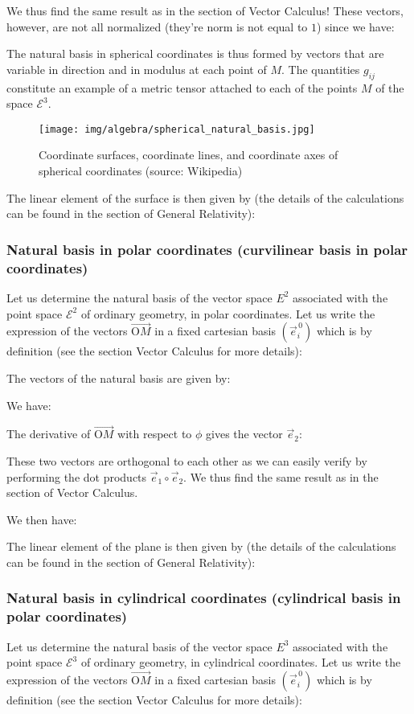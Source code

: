 	We thus find the same result as in the section of Vector Calculus! These vectors, however, are not all normalized (they're norm is not equal to $1$) since we have:
	
	The natural basis in spherical coordinates is thus formed by vectors that are variable in direction and in modulus at each point of $M$. The quantities $g_{ij}$ constitute an example of a metric tensor attached to each of the points $M$ of the space $\mathcal{E}^3$.
	\begin{figure}[H]
		\centering
		\texttt{[image: img/algebra/spherical\_natural\_basis.jpg]}
		\caption[Coordinate surfaces, coordinate lines, and coordinate axes of spherical coordinates]{Coordinate surfaces, coordinate lines, and coordinate axes of spherical coordinates (source: Wikipedia)}
	\end{figure}
	The linear element of the surface is then given by (the details of the calculations can be found in the section of General Relativity):
	
	
	\subsubsection{Natural basis in polar coordinates (curvilinear basis in polar coordinates)}
	Let us determine the natural basis of the vector space $E^2$ associated with the point space $\mathcal{E}^2$ of ordinary geometry, in polar coordinates. Let us write the expression of the vectors $\overrightarrow{\text{O}M}$ in a fixed cartesian basis $(\vec{e}_i^{\,0})$ which is by definition (see the section Vector Calculus for more details):
	
	The vectors of the natural basis are given by:
	
	We have:
	
	The derivative of $\overrightarrow{\text{O}M}$ with respect to $\phi$ gives the vector $\vec{e}_2$:
	
	These two vectors are orthogonal to each other as we can easily verify by performing the dot products $\vec{e}_1\circ\vec{e}_2$. We thus find the same result as in the section of Vector Calculus.
	
	We then have:
	
	The linear element of the plane is then given by (the details of the calculations can be found in the section of General Relativity):
	
	
	\subsubsection{Natural basis in cylindrical coordinates (cylindrical basis in polar coordinates)}
	Let us determine the natural basis of the vector space $E^3$ associated with the point space $\mathcal{E}^3$ of ordinary geometry, in cylindrical coordinates. Let us write the expression of the vectors $\overrightarrow{\text{O}M}$ in a fixed cartesian basis $(\vec{e}_i^{\,0})$ which is by definition (see the section Vector Calculus for more details):
	
